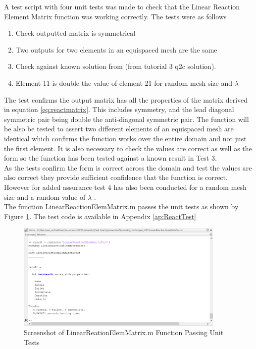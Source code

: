 \documentclass[11pt]{article}
\begin{document}
A test script with four unit tests was made to check that the Linear Reaction Element Matrix function was working correctly. The tests were as follows\\
\begin{enumerate}
\item{Check outputted matrix is symmetrical}
\item{Two outputs for two elements in an equispaced mesh are the same }
\item{Check against known solution from (from tutorial 3 q2c solution).}
\item{Element 11 is double the value of element 21 for random mesh size and $\lambda$}
\end{enumerate}

The test confirms the output matrix has all the properties of the matrix derived in equation \ref{eq:reactmatrix}. This includes symmetry, and the lead diagonal symmetric pair being double the anti-diagonal symmetric pair. The function will be also be tested to assert two different elements of an equispaced mesh are identical which confirms the function works over the entire domain and not just the first element. It is also necessary to check the values are correct as well as the form so the function has been tested against a known result in Test 3.  \\
As the tests confirm the form is correct across the domain and test the values are also correct they provide sufficient confidence that the function is correct. However for added assurance test 4 has also been conducted for a random mesh size and a random value of $\lambda$ . \\
The function LinearReactionElemMatrix.m passes the unit tests as shown by Figure \ref{fig:passTest2}. The test code is available in Appendix \ref{ap:ReactTest}

\begin{figure}[h!]
	\centering
	\includegraphics[width=0.9\textwidth]{LRtest2.PNG}
	\caption{Screenshot of LinearReationElemMatrix.m Function Passing Unit Tests}\label{fig:passTest2}
\end{figure}
\end{document}
